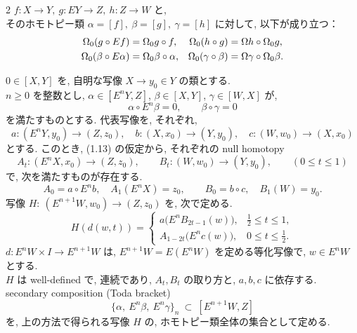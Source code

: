 \documentclass[10pt, leqno]{ltjsarticle}
\newcommand{\Ex}{E}        %
\newcommand{\Ox}{\Omega}   %
\numberwithin{equation}{section}
\theoremstyle{plain}
\theoremstyle{definition}
\theoremstyle{remark}
\begin{document}
\begin{paracol}{2}
$f:X\to Y,\ g:EY\to Z,\ h:Z\to W$ と,\\
そのホモトピー類 $\alpha=[f],\ \beta=[g],\ \gamma=[h]$ に対して,
以下が成り立つ：
\begin{equation}
\raisetag{2ex}
\begin{aligned}[t]
\Omega_0(g\circ Ef)&=\Omega_0 g\circ f, &
\Omega_0(h\circ g)&=\Ox h\circ \Omega_0 g,\\
\Omega_0(\beta\circ E\alpha)&=\Omega_0 \beta\circ \alpha, &
\Omega_0(\gamma\circ \beta)&=\Ox\gamma\circ \Omega_0\beta .
\end{aligned}
\end{equation}

$0\in[X, Y]$ を,
自明な写像 $X\to y_0\in Y$ の類とする. \\
$n\ge 0$ を整数とし, 
$\alpha\in[\Ex^n Y, Z]$, $\beta\in[X, Y]$, $\gamma\in[W, X]$ が,
\begin{equation}
\alpha\circ \Ex^n\beta=0,\qquad \beta\circ \gamma=0
\end{equation}
を満たすものとする. 代表写像を, それぞれ,
\[
a:(\Ex^n Y,y_0)\to (Z,z_0),\quad
b:(X,x_0)\to (Y,y_0),\quad
c:(W,w_0)\to (X,x_0)
\]
とする. 
このとき, (1.13) の仮定から, それぞれの null homotopy
\[
A_t:(\Ex^n X,x_0)\to (Z,z_0),\qquad
B_t:(W,w_0)\to (Y,y_0),\qquad (0\le t\le 1)
\]
で, 次を満たすものが存在する. 
\[
A_0=a\circ \Ex^n b,\quad A_1(\Ex^n X)=z_0,\qquad
B_0=b\circ c,\quad B_1(W)=y_0.
\]
写像 $H:\ (\Ex^{n+1}W,w_0)\to (Z,z_0)$ を, 次で定める. 
\begin{equation}\label{eq:H-def}
H(d(w,t))=
\begin{cases}
a\bigl(\Ex^n B_{2t-1}(w)\bigr), & \tfrac12\le t\le 1,\\[2mm]
A_{1-2t}\bigl(\Ex^n c(w)\bigr), & 0\le t\le \tfrac12.
\end{cases}
\end{equation}
$d:\Ex^n W\times I\to \Ex^{n+1}W$ は,
\(E^{n+1}W= E(E^n W)\) を定める等化写像で, 
$w\in \Ex^n W$ とする.\\
$H$ は well-defined で, 連続であり, 
$A_t,B_t$ の取り方と, $a,b,c$ に依存する. \\
secondary composition (Toda bracket)
\[
\{\alpha,\ \Ex^n\beta,\ \Ex^n\gamma\}_n\ \subset\ [\Ex^{n+1}W, Z]
\]
を, 
上の方法で得られる写像 $H$ の, 
ホモトピー類全体の集合として定める. \\

\end{paracol}
\end{document}
